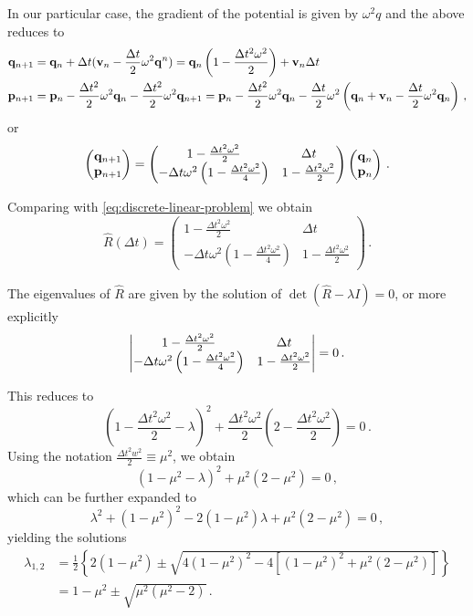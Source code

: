 \documentclass[12pt, class=report, crop=false]{standalone}
\begin{document}
In our particular case, the gradient of the potential is given by
\(\omega^2 q\) and the above reduces to
\begin{align*}
  \vb{q}_{n+1} &= \vb{q}_n + \Delta t (\vb{v}_n - \frac{\Delta t}{2} \omega^2 \vb{q}^n) =
  \vb{q}_n \left(1 - \frac{\Delta t^2 \omega^2}{2}\right) + \vb{v}_n \Delta t \\
  \vb{p}_{n+1} &= \vb{p}_n - \frac{\Delta t^2}{2} \omega^2 \vb{q}_n
  -\frac{\Delta t^2}{2} \omega^2 \vb{q}_{n+1} =
  \vb{p}_n - \frac{\Delta t^2}{2} \omega^2 \vb{q}_n
  -\frac{\Delta t}{2}\omega^2 \left(\vb{q}_n+\vb{v}_n-\frac{\Delta t}{2}\omega^2 \vb{q}_n\right)\,,
\end{align*}
or
\[
\begin{pmatrix}
  \vb{q}_{n+1} \\
  \vb{p}_{n+1}
\end{pmatrix} =
\begin{pmatrix}
  1 - \frac{\Delta t^2 \omega^2}{2} & \Delta t \\
  -\Delta t \omega^2 \left(1 - \frac{\Delta t^2 \omega^2}{4}\right) &
  1 - \frac{\Delta t^2 \omega^2}{2}
\end{pmatrix}
\begin{pmatrix}
  \vb{q}_n \\
  \vb{p}_n
\end{pmatrix}\,.
\]

Comparing with \cref{eq:discrete-linear-problem} we obtain
\[
\hat{R}(\Delta t) =
\begin{pmatrix}
  1 - \frac{\Delta t^2 \omega^2}{2} & \Delta t \\
  -\Delta t \omega^2 \left(1 - \frac{\Delta t^2 \omega^2}{4}\right) &
  1 - \frac{\Delta t^2 \omega^2}{2}
\end{pmatrix}\,.
\]

The eigenvalues of \(\hat{R}\) are given by the solution of
\(
\det(\hat{R} - \lambda I) = 0
\), or more explicitly
\[
\vmqty{
1 - \frac{\Delta t^2 \omega^2}{2} & \Delta t \\
-\Delta t \omega^2 \left(1 - \frac{\Delta t^2 \omega^2}{4}\right) &
1 - \frac{\Delta t^2 \omega^2}{2}
} = 0\,.
\]

This reduces to
\[
{\left(1-\frac{\Delta t^{2} \omega^2}{2}-\lambda\right)}^{2}+
\frac{\Delta t^{2} \omega^2}{2}\left(2-\frac{\Delta t^2 \omega^2}{2}\right) = 0\,.
\]
Using the notation \(\frac{\Delta t^{2} w^{2}}{2}\equiv\mu^{2}\),
we obtain
\[
{\left(1-\mu^{2}-\lambda\right)}^2+\mu^{2}\left(2-\mu^{2}\right)=0\,,
\]
which can be further expanded to
\[
\lambda^{2}+{\left(1-\mu^{2}\right)}^{2}-2\left(1-\mu^{2}\right) \lambda+\mu^{2}\left(2-\mu^{2}\right)=0\,,
\]
yielding the solutions
\begin{align*}
  \lambda_{1,2} &= \frac{1}{2} \left\{2(1-\mu^2) \pm
  \sqrt{4{(1-\mu^2)}^2 - 4\left[{(1-\mu^2)}^2 + \mu^2 (2-\mu^2)\right]}\right\} \\
  &= 1-\mu^2 \pm \sqrt{\mu^2(\mu^2-2)}\,.
\end{align*}
\end{document}
